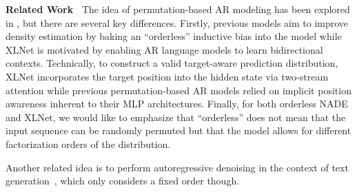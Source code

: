 

\textbf{Related Work~} The idea of permutation-based AR modeling has been explored in \cite{uria2016neural,germain2015made}, but there are several key differences.
Firstly, previous models aim to improve density estimation by baking an ``orderless'' inductive bias into the model while XLNet is motivated by enabling AR language models to learn bidirectional contexts.
Technically, to construct a valid target-aware prediction distribution, XLNet incorporates the target position into the hidden state via two-stream attention while previous permutation-based AR models relied on implicit position awareness inherent to their MLP architectures.
Finally, for both orderless NADE and XLNet, we would like to emphasize that ``orderless'' does not mean that the input sequence can be randomly permuted but that the model allows for different factorization orders of the distribution.


Another related idea is to perform autoregressive denoising in the context of text generation~\cite{fedus2018maskgan}, which only considers a fixed order though.

